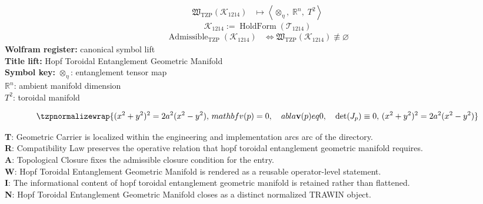 \noindent
\begin{minipage}[t]{0.48\linewidth}
\begingroup
\small
\[
\begin{aligned}
\mathfrak{W}_{\mathrm{TZP}}\!\left(\mathcal{K}_{1214}\right)
&\longmapsto
\left\langle \otimes_{\eta},\; \mathbb{R}^{n},\; T^{2} \right\rangle
\end{aligned}
\]
\[
\mathcal{K}_{1214}
:=
\operatorname{HoldForm}\!\left(\mathcal{T}_{1214}\right)
\]
\[
\begin{aligned}
\operatorname{Admissible}_{\mathrm{TZP}}\!\left(\mathcal{K}_{1214}\right)
&\Longleftrightarrow
\mathfrak{W}_{\mathrm{TZP}}\!\left(\mathcal{K}_{1214}\right)\not\equiv\varnothing
\end{aligned}
\]
\textbf{Wolfram register:} canonical symbol lift\\
\textbf{Title lift:} Hopf Toroidal Entanglement Geometric Manifold\\
\textbf{Symbol key:} \(\otimes_{\eta}\): entanglement tensor map\\ \(\mathbb{R}^{n}\): ambient manifold dimension\\ \(T^{2}\): toroidal manifold
\par
\endgroup
\end{minipage}\hfill
\begin{minipage}[t]{0.48\linewidth}
\[
\tzpnormalizewrap{(x^2 + y^2)^2 = 2a^2(x^2 - y^2),\,mathbf{v}(p) = 0, \quad  abla \mathbf{v}(p)  eq 0, \quad \text{det}(J_p) \equiv 0,\,(x^2 + y^2)^2 = 2a^2(x^2 - y^2)}
\]

\small
\textbf{T}: Geometric Carrier is localized within the engineering and implementation arcs arc of the directory.\\
\textbf{R}: Compatibility Law preserves the operative relation that hopf toroidal entanglement geometric manifold requires.\\
\textbf{A}: Topological Closure fixes the admissible closure condition for the entry.\\
\textbf{W}: Hopf Toroidal Entanglement Geometric Manifold is rendered as a reusable operator-level statement.\\
\textbf{I}: The informational content of hopf toroidal entanglement geometric manifold is retained rather than flattened.\\
\textbf{N}: Hopf Toroidal Entanglement Geometric Manifold closes as a distinct normalized TRAWIN object.
\normalsize
\end{minipage}

